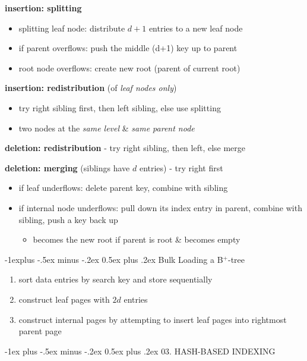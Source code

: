 \documentclass[10pt, landscape]{article}
\makeatletter
\renewcommand{\section}{\@startsection{section}{1}{0mm}%
  {-1ex plus -.5ex minus -.2ex}%
  {0.5ex plus .2ex}%
{\normalfont\large\bfseries}}
\renewcommand{\subsection}{\@startsection{subsection}{2}{0mm}%
  {-1explus -.5ex minus -.2ex}%
  {0.5ex plus .2ex}%
{\normalfont\normalsize\bfseries}}
\makeatother
\begin{document}
\begin{multicols*}{4}
  \textbf{insertion: splitting}
  \begin{itemize}
    \item splitting leaf node: distribute $d+1$ entries to a new leaf node
    \item if parent overflows: push the middle (d+1) key up to parent
    \item root node overflows: create new root (parent of current root)
  \end{itemize}

  \textbf{insertion: redistribution} (of \textit{leaf nodes only})
  \begin{itemize}
    \item try right sibling first, then left sibling, else use splitting
    \item {} two nodes at the \textit{same level} \& \textit{same parent node}
  \end{itemize}

  \textbf{deletion: redistribution} - try right sibling, then left, else merge

  \textbf{deletion: merging} (siblings have $d$ entries) - try right first 
  \begin{itemize}
    \item if leaf underflows: delete parent key, combine with sibling
    \item if internal node underflows: pull down its index entry in parent, combine with sibling, push a key back up
      \begin{itemize}
        \item becomes the new root if parent is root \& becomes empty
      \end{itemize}
  \end{itemize}

  \subsection{Bulk Loading a B$^+$-tree}

  \begin{enumerate}
    \item sort data entries by search key and store sequentially
    \item construct leaf pages with $2d$ entries
    \item construct internal pages by attempting to insert leaf pages into rightmost parent page
  \end{enumerate}

  \section{03. HASH-BASED INDEXING}


\end{multicols*}
\end{document}
